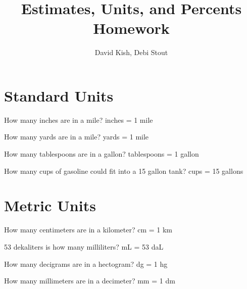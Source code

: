 \documentclass{ximera}
\author{David Kish, Debi Stout}
\title{Estimates, Units, and Percents Homework}
\begin{document}
\begin{abstract}
\end{abstract}
\maketitle

\section{Standard Units} 
\begin{exercise}
How many inches are in a mile?
 inches = 1 mile
\end{exercise}
 \begin{exercise}
 How many yards are in a mile? 
  yards = 1 mile
 \end{exercise}
 \begin{exercise}
 How many tablespoons are in a gallon? 
  tablespoons = 1 gallon
 \end{exercise}
  \begin{exercise}
 How many cups of gasoline could fit into a 15 gallon tank?
  cups = 15 gallons
 \end{exercise}
 
\section{Metric Units}
  \begin{exercise}
 How many centimeters are in a kilometer? 
  cm = 1 km
 \end{exercise}
   \begin{exercise}
 53 dekaliters is how many milliliters?
  mL = 53 daL
 \end{exercise}
   \begin{exercise}
 How many decigrams are in a hectogram? 
  dg = 1 hg
 \end{exercise}
   \begin{exercise}
 How many millimeters are in a decimeter?
  mm = 1 dm
 \end{exercise}
\end{document}
